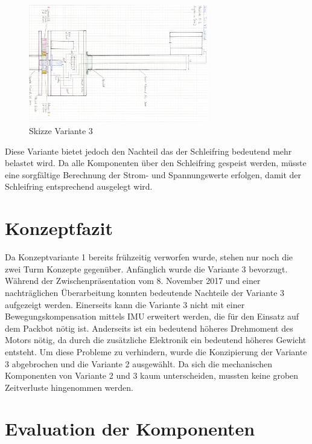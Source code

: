 \begin{figure}[H]
	\centering
	\includegraphics[angle=90,width=0.7\textwidth]{resources/skizze_rotierend.PNG}
	\caption[Skizze Variante 3]{Skizze Variante 3 }
	\label{fig:skizze_rotierend}
\end{figure} 

Diese Variante bietet jedoch den Nachteil das der Schleifring bedeutend mehr belastet wird. Da alle Komponenten über den Schleifring gespeist werden, müsste eine sorgfältige Berechnung der Strom- und Spannungswerte erfolgen, damit der Schleifring entsprechend ausgelegt wird.

 \section {Konzeptfazit}
 \label{sec:Konzeptfazit}
 Da Konzeptvariante 1 bereits frühzeitig verworfen wurde, stehen nur noch die zwei Turm Konzepte gegenüber. Anfänglich wurde die Variante 3 bevorzugt. Während der Zwischenpräsentation vom 8. November 2017 und einer nachträglichen Überarbeitung konnten bedeutende Nachteile der Variante 3 aufgezeigt werden. Einerseits kann die Variante 3 nicht mit einer Bewegungskompensation mittels \ac{IMU} erweitert werden, die für den Einsatz auf dem Packbot nötig ist. Anderseits ist ein bedeutend höheres Drehmoment des Motors nötig, da durch die zusätzliche Elektronik ein bedeutend höheres Gewicht entsteht. Um diese Probleme zu verhindern, wurde die Konzipierung der Variante 3 abgebrochen und die Variante 2 ausgewählt. Da sich die mechanischen Komponenten von Variante 2 und 3 kaum unterscheiden, mussten keine groben Zeitverluste hingenommen werden.
 
\section {Evaluation der Komponenten}
\label{sec:ausgewählteKomponenten}


